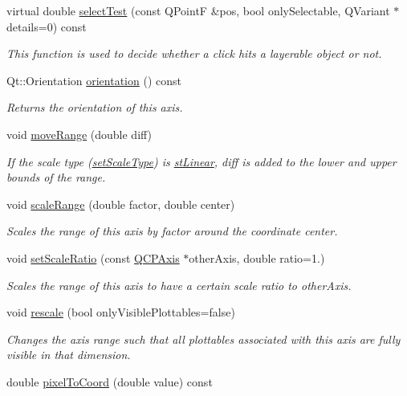 \begin{DoxyCompactItemize}
virtual double \hyperlink{classQCPAxis_a2877a6230920c118be65c6113089f467}{select\+Test} (const Q\+Point\+F \&pos, bool only\+Selectable, Q\+Variant $\ast$details=0) const 
\begin{DoxyCompactList}\small\item\em This function is used to decide whether a click hits a layerable object or not. \end{DoxyCompactList}\item 
Qt\+::\+Orientation \hyperlink{classQCPAxis_a57483f2f60145ddc9e63f3af53959265}{orientation} () const 
\begin{DoxyCompactList}\small\item\em Returns the orientation of this axis. \end{DoxyCompactList}\item 
void \hyperlink{classQCPAxis_a18f3a68f2b691af1fd34b6593c886630}{move\+Range} (double diff)
\begin{DoxyCompactList}\small\item\em If the scale type (\hyperlink{classQCPAxis_adef29cae617af4f519f6c40d1a866ca6}{set\+Scale\+Type}) is \hyperlink{classQCPAxis_a36d8e8658dbaa179bf2aeb973db2d6f0aff6e30a11a828bc850caffab0ff994f6}{st\+Linear}, {\itshape diff} is added to the lower and upper bounds of the range. \end{DoxyCompactList}\item 
void \hyperlink{classQCPAxis_a7072ff96fe690148f1bbcdb4f773ea1c}{scale\+Range} (double factor, double center)
\begin{DoxyCompactList}\small\item\em Scales the range of this axis by {\itshape factor} around the coordinate {\itshape center}. \end{DoxyCompactList}\item 
void \hyperlink{classQCPAxis_af4bbd446dcaee5a83ac30ce9bcd6e125}{set\+Scale\+Ratio} (const \hyperlink{classQCPAxis}{Q\+C\+P\+Axis} $\ast$other\+Axis, double ratio=1.)
\begin{DoxyCompactList}\small\item\em Scales the range of this axis to have a certain scale {\itshape ratio} to {\itshape other\+Axis}. \end{DoxyCompactList}\item 
void \hyperlink{classQCPAxis_a499345f02ebce4b23d8ccec96e58daa9}{rescale} (bool only\+Visible\+Plottables=false)
\begin{DoxyCompactList}\small\item\em Changes the axis range such that all plottables associated with this axis are fully visible in that dimension. \end{DoxyCompactList}\item 
\hypertarget{classQCPAxis_ae9289ef7043b9d966af88eaa95b037d1}{}double \hyperlink{classQCPAxis_ae9289ef7043b9d966af88eaa95b037d1}{pixel\+To\+Coord} (double value) const \label{classQCPAxis_ae9289ef7043b9d966af88eaa95b037d1}


\end{DoxyCompactItemize}
